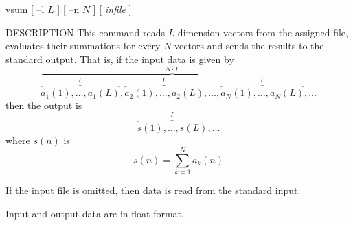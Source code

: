 % 
% 
% 
% 
%                                                                        
%

\begin{synopsis}
\item[vsum] [ --l $L$ ] [ --n $N$ ] [ {\em infile} ]
\end{synopsis}

\begin{qsection}{DESCRIPTION}
This command reads $L$ dimension vectors from the assigned file,
evaluates their summations for every $N$ vectors and sends the
results to the standard output.
That is, if the input data is given by
\begin{displaymath}
\overbrace{
  \overbrace{a_1(1),\ldots,a_1(L)}^{L},
  \overbrace{a_2(1),\ldots,a_2(L)}^{L},\ldots,
  \overbrace{a_N(1),\ldots,a_N(L)}^{L}
}^{N \cdot L},\ldots
\end{displaymath}
then the output is 
\begin{displaymath}
  \overbrace{s(1),\ldots,s(L)}^{L},\ldots
\end{displaymath}
where $s(n)$ is
\begin{displaymath}
  s(n)=\sum_{k=1}^{N} a_k(n)
\end{displaymath}
\par
If the input file is omitted, then data is read from the standard input.
\par
Input and output data are in float format.
\end{qsection}

